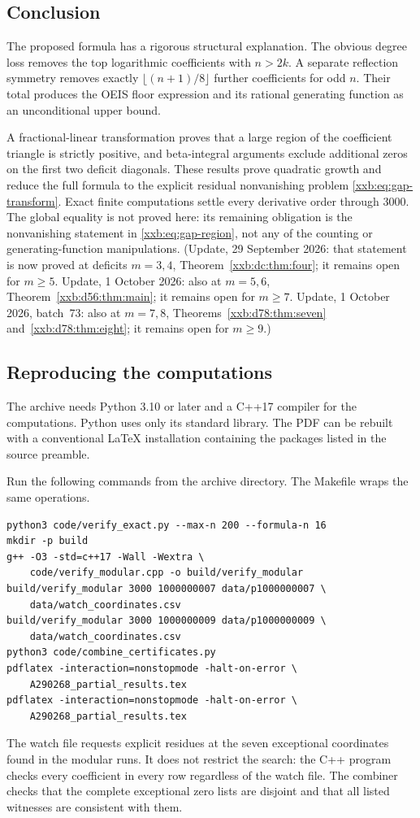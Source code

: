 \documentclass[11pt,a4paper]{article}
\numberwithin{equation}{section}
\theoremstyle{definition}
\theoremstyle{remark}
\theoremstyle{plain}
\begin{document}
\subsection{Conclusion}
The proposed formula has a rigorous structural explanation. The obvious
degree loss removes the top logarithmic coefficients with $n>2k$.
A separate reflection symmetry removes exactly
$\lfloor(n+1)/8\rfloor$ further coefficients for odd $n$. Their total
produces the OEIS floor expression and its rational generating function
as an unconditional upper bound.

A fractional-linear transformation proves that a large region of the
coefficient triangle is strictly positive, and beta-integral arguments
exclude additional zeros on the first two deficit diagonals. These
results prove quadratic growth and reduce the full formula to the
explicit residual nonvanishing problem \eqref{xxb:eq:gap-transform}.
Exact finite computations settle every derivative order through $3000$.
The global equality is not proved here: its remaining obligation is the
nonvanishing statement in \eqref{xxb:eq:gap-region}, not any of the counting
or generating-function manipulations.  (Update, 29 September 2026: that
statement is now proved at deficits $m=3,4$, Theorem~\ref{xxb:dc:thm:four};
it remains open for $m\ge5$.  Update, 1 October 2026: also at $m=5,6$,
Theorem~\ref{xxb:d56:thm:main}; it remains open for $m\ge7$.
Update, 1 October 2026, batch~73: also at $m=7,8$,
Theorems~\ref{xxb:d78:thm:seven} and~\ref{xxb:d78:thm:eight}; it remains open
for $m\ge9$.)

\subsection{Reproducing the computations}\label{xxb:app:reproduce}
The archive needs Python 3.10 or later and a C++17 compiler for the
computations. Python uses only its standard library. The PDF can be
rebuilt with a conventional LaTeX installation containing the packages
listed in the source preamble.

Run the following commands from the archive directory. The Makefile
wraps the same operations.
\begin{lstlisting}
python3 code/verify_exact.py --max-n 200 --formula-n 16
mkdir -p build
g++ -O3 -std=c++17 -Wall -Wextra \
    code/verify_modular.cpp -o build/verify_modular
build/verify_modular 3000 1000000007 data/p1000000007 \
    data/watch_coordinates.csv
build/verify_modular 3000 1000000009 data/p1000000009 \
    data/watch_coordinates.csv
python3 code/combine_certificates.py
pdflatex -interaction=nonstopmode -halt-on-error \
    A290268_partial_results.tex
pdflatex -interaction=nonstopmode -halt-on-error \
    A290268_partial_results.tex
\end{lstlisting}
The watch file requests explicit residues at the seven exceptional
coordinates found in the modular runs. It does not restrict the search:
the C++ program checks every coefficient in every row regardless of the
watch file. The combiner checks that the complete exceptional zero lists
are disjoint and that all listed witnesses are consistent with them.
\end{document}
